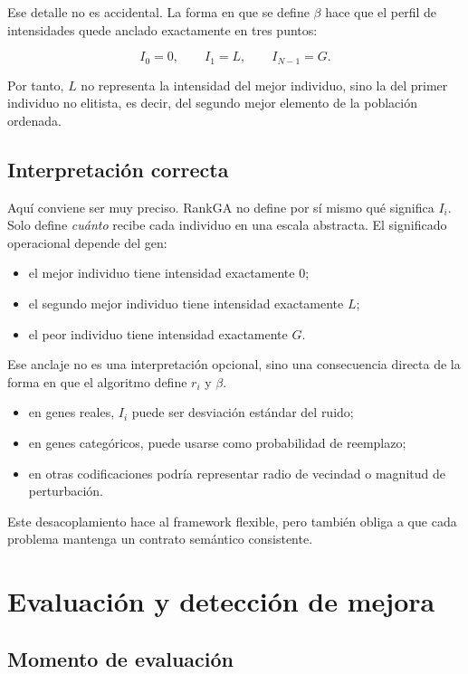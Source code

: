 \documentclass[11pt]{article}
\begin{document}
Ese detalle no es accidental. La forma en que se define \(\beta\) hace que el
perfil de intensidades quede anclado exactamente en tres puntos:

\[
I_0 = 0,\qquad I_1 = L,\qquad I_{N-1} = G.
\]

Por tanto, \(L\) no representa la intensidad del mejor individuo, sino la del
primer individuo no elitista, es decir, del segundo mejor elemento de la
poblaci\'on ordenada.

\subsection{Interpretaci\'on correcta}

Aqu\'i conviene ser muy preciso. RankGA no define por s\'i mismo qu\'e significa
\(I_i\). Solo define \emph{cu\'anto} recibe cada individuo en una escala
abstracta. El significado operacional depende del gen:

\begin{itemize}
  \item el mejor individuo tiene intensidad exactamente \(0\);
  \item el segundo mejor individuo tiene intensidad exactamente \(L\);
  \item el peor individuo tiene intensidad exactamente \(G\).
\end{itemize}

Ese anclaje no es una interpretaci\'on opcional, sino una consecuencia directa
de la forma en que el algoritmo define \(r_i\) y \(\beta\).

\begin{itemize}
  \item en genes reales, \(I_i\) puede ser desviaci\'on est\'andar del ruido;
  \item en genes categ\'oricos, puede usarse como probabilidad de reemplazo;
  \item en otras codificaciones podr\'ia representar radio de vecindad o
  magnitud de perturbaci\'on.
\end{itemize}

Este desacoplamiento hace al framework flexible, pero tambi\'en obliga a que
cada problema mantenga un contrato sem\'antico consistente.

\section{Evaluaci\'on y detecci\'on de mejora}

\subsection{Momento de evaluaci\'on}
\end{document}
